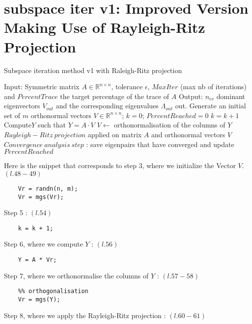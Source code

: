 \documentclass{article}
\begin{document}
\section{subspace iter v1: Improved Version Making Use of Rayleigh-Ritz Projection}

\begin{algorithm}[H]
\caption{Subspace iteration method v1 with Raleigh-Ritz projection}
\begin{algorithmic}[1]
    \State Input: Symmetric matrix $A \in \mathbb{R}^{n \times n}$, tolerance $\epsilon$, $MaxIter$ (max nb of iterations) and $PercentTrace$ the
target percentage of the trace of $A$
    \State Output: $n_{ev}$ dominant eigenvectors $V_{out}$ and the corresponding eigenvalues $\Lambda_{out}$ out.
    \State Generate an initial set of $m$ orthonormal vectors $V \in \mathbb{R}^{n \times n}$; $k = 0$; $PercentReached = 0$
    \Repeat
    \State$k = k+1$
    \State Compute$Y$ such that $Y = A \cdot V$
    \State$V \leftarrow$ orthonormalisation of the columns of $Y$
    \State$Rayleigh-Ritz\ projection$ applied on matrix $A$ and orthonormal vectors $V$
    \State$Convergence\ analysis\ step$ : save eigenpairs that have converged and update $PercentReached$
\end{algorithmic}
\end{algorithm}

Here is the snippet that corresponds to step $3$, where we initialize the Vector $V$. $(l.48-49)$

\begin{lstlisting}
    Vr = randn(n, m);
    Vr = mgs(Vr);
\end{lstlisting}

Step 5 : $(l.54)$

\begin{lstlisting}
    k = k + 1;
\end{lstlisting}

Step 6, where we compute $Y$ : $(l.56)$

\begin{lstlisting}
    Y = A * Vr;
\end{lstlisting}

Step 7, where we orthonormalise the columns of $Y$ : $(l.57-58)$

\begin{lstlisting}
    %% orthogonalisation
    Vr = mgs(Y);
\end{lstlisting}

Step 8, where we apply the Rayleigh-Ritz projection : $(l.60-61)$
\end{document}
